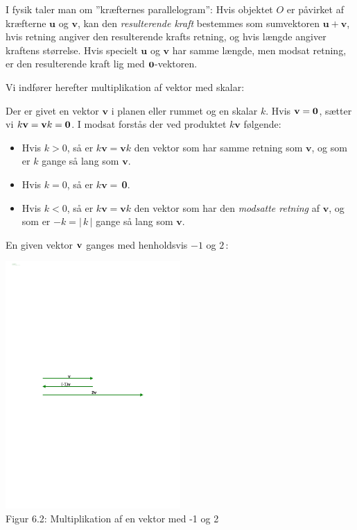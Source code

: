 \begin{info}
I fysik taler man om ''kræfternes parallelogram'': Hvis objektet $O$ er påvirket af kræfterne $\mathbf u$ og $\mathbf v$, kan den \textit{resulterende kraft} bestemmes som sumvektoren $\mathbf u+ \mathbf v$, hvis retning angiver den resulterende krafts retning, og hvis længde angiver kraftens størrelse. Hvis specielt $\mathbf u$ og $\mathbf v$ har samme længde, men modsat retning, er den resulterende kraft lig med $\bm{0}$-vektoren.  
\end{info} 

Vi indfører herefter multiplikation af vektor med skalar:\medskip \\
\begin{definition}\label{multiplikation}
Der er givet en vektor $\mathbf v$ i planen eller rummet og en skalar $k$. Hvis $\mathbf{v} =\bm{0}$, sætter vi $k\mathbf v=\mathbf v k=\bm{0}$. I modsat forstås der ved produktet $k\mathbf v$ følgende:
\begin{itemize}
\item
Hvis $k>0$, så er $k\mathbf v=\mathbf v k$ den vektor som har samme retning som $\mathbf v$, og som er $k$ gange så lang som $\mathbf v$.
\item
Hvis $k=0$, så er $k\mathbf v=\,$\textbf{0}.
\item
Hvis $k<0$, så er $k\mathbf v=\mathbf v k$ den vektor som har den \textit{modsatte retning} af $\mathbf v$, og som er $-k=|\,k\,|$ gange så lang som $\mathbf v$.
\end{itemize}
\end{definition}

\begin{example}
En given vektor $\mathbf{v}$ ganges med henholdsvis $-1$ og $2\,:$ 
\begin{center}
		\includegraphics[trim=4cm 13.5cm 4cm 13.5cm,width=0.50\textwidth,clip]{geometer/vektor3.pdf}
\\Figur 6.2: Multiplikation af en vektor med -1 og 2		
\end{center}
\end{example}

